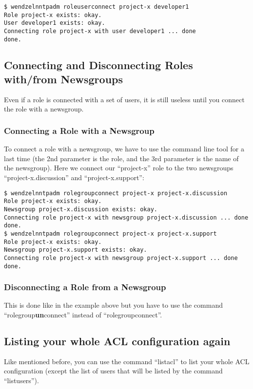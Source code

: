 \begin{verbatim}
$ wendzelnntpadm roleuserconnect project-x developer1
Role project-x exists: okay.
User developer1 exists: okay.
Connecting role project-x with user developer1 ... done
done.
\end{verbatim}

\subsection{Connecting and Disconnecting Roles with/from Newsgroups}

Even if a role is connected with a set of users, it is still useless until you connect the role with a newsgroup.

\subsubsection{Connecting a Role with a Newsgroup}

To connect a role with a newsgroup, we have to use the command line tool for a last time (the 2nd parameter is the role, and the 3rd parameter is the name of the newsgroup). Here we connect our ``project-x'' role to the two newsgroups ``project-x.discussion'' and ``project-x.support'':

\begin{verbatim}
$ wendzelnntpadm rolegroupconnect project-x project-x.discussion
Role project-x exists: okay.
Newsgroup project-x.discussion exists: okay.
Connecting role project-x with newsgroup project-x.discussion ... done
done.
$ wendzelnntpadm rolegroupconnect project-x project-x.support
Role project-x exists: okay.
Newsgroup project-x.support exists: okay.
Connecting role project-x with newsgroup project-x.support ... done
done.
\end{verbatim}

\subsubsection{Disconnecting a Role from a Newsgroup}

This is done like in the example above but you have to use the command ``rolegroup\textbf{un}connect'' instead of ``rolegroupconnect''.

\subsection{Listing your whole ACL configuration again}

Like mentioned before, you can use the command ``listacl'' to list your whole ACL configuration (except the list of users that will be listed by the command ``listusers'').

